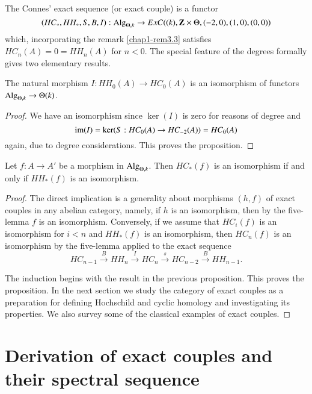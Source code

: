 \begin{remark}\label{chap1-rem3.5}
The Connes' exact sequence (or exact couple) is a functor 
$$
(HC_{\ast},HH_{\ast},S,B,I):\operatorname{Alg}_{\Theta,k}\to
ExC((k),\mathbf{Z}\times\Theta,(-2,0),(1,0),(0,0)) 
$$
which, incorporating the remark \eqref{chap1-rem3.3} satisfies
$HC_{n}(A)=0=HH_{n}(A)$ for $n<0$. The special feature of the degrees
formally gives two elementary results.
\end{remark}

\begin{proposition}\label{chap1-prop3.6}
The natural morphism $I:HH_{0}(A)\to HC_{0}(A)$ is an\pageoriginale
isomorphism of functors $\operatorname{Alg}_{\Theta,k}\to \Theta(k)$. 
\end{proposition}

\begin{proof}
We have an isomorphism since $\ker(I)$ is zero for reasons of degree
and
$$
\operatorname{im}(I)=\ker(S:HC_{0}(A)\to HC_{-2}(A))=HC_{0}(A)
$$
again, due to degree considerations. This proves the proposition.
\end{proof}

\begin{proposition}\label{chap1-prop3.7}
Let $f:A\to A'$ be a morphism in $\operatorname{Alg}_{\Theta,k}$. Then
$HC_{\ast}(f)$ is an isomorphism if and only if $HH_{\ast}(f)$ is an
isomorphism. 
\end{proposition}

\begin{proof}
The direct implication is a generality about morphisms $(h,f)$ of
exact couples in any abelian category, namely, if $h$ is an
isomorphism, then by the five-lemma $f$ is an isomorphism. Conversely,
if we assume that $HC_{i}(f)$ is an isomorphism for $i<n$ and
$HH_{\ast}(f)$ is an isomorphism, then $HC_{n}(f)$ is an isomorphism
by the five-lemma applied to the exact sequence
$$
HC_{n-1}\xrightarrow{B}HH_{n}\xrightarrow{I}HC_{n}\xrightarrow{s}HC_{n-2}\xrightarrow{B}HH_{n-1}. 
$$

The induction begins with the result in the previous proposition. This
proves the proposition.
In the next section we study the category of exact couples as a
preparation for defining Hochschild and cyclic homology and
investigating its properties. We also survey some of the classical
examples of exact couples. 
\end{proof}

\section{Derivation of exact couples and their spectral
  sequence}\label{chap1-sec4} 

